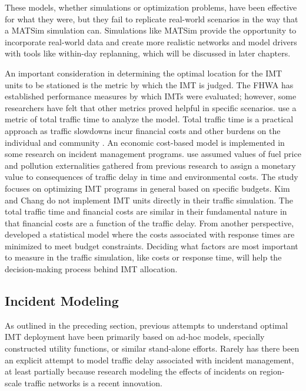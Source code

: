 \documentclass[
  letterpaper,
  authoryear]{elsarticle}
\begin{document}
These models, whether simulations or optimization problems, have been
effective for what they were, but they fail to replicate real-world
scenarios in the way that a MATSim simulation can. Simulations like
MATSim provide the opportunity to incorporate real-world data and create
more realistic networks and model drivers with tools like within-day
replanning, which will be discussed in later chapters.

An important consideration in determining the optimal location for the
IMT units to be stationed is the metric by which the IMT is judged. The
FHWA has established performance measures by which IMTs were evaluated;
however, some researchers have felt that other metrics proved helpful in
specific scenarios. \citet{pal2002} use a metric of total traffic time
to analyze the model. Total traffic time is a practical approach as
traffic slowdowns incur financial costs and other burdens on the
individual and community \citep{bivina2016}. An economic cost-based
model is implemented in some research on incident management programs.
\citet{kim2012} use assumed values of fuel price and pollution
externalities gathered from previous research to assign a monetary value
to consequences of traffic delay in time and environmental costs. The
study focuses on optimizing IMT programs in general based on specific
budgets. Kim and Chang do not implement IMT units directly in their
traffic simulation. The total traffic time and financial costs are
similar in their fundamental nature in that financial costs are a
function of the traffic delay. From another perspective,
\citet{ozbay2013} developed a statistical model where the costs
associated with response times are minimized to meet budget constraints.
Deciding what factors are most important to measure in the traffic
simulation, like costs or response time, will help the decision-making
process behind IMT allocation.

\hypertarget{incident-modeling}{%
\subsection{Incident Modeling}\label{incident-modeling}}

As outlined in the preceding section, previous attempts to understand
optimal IMT deployment have been primarily based on ad-hoc models,
specially constructed utility functions, or similar stand-alone efforts.
Rarely has there been an explicit attempt to model traffic delay
associated with incident management, at least partially because research
modeling the effects of incidents on region-scale traffic networks is a
recent innovation.
\end{document}
